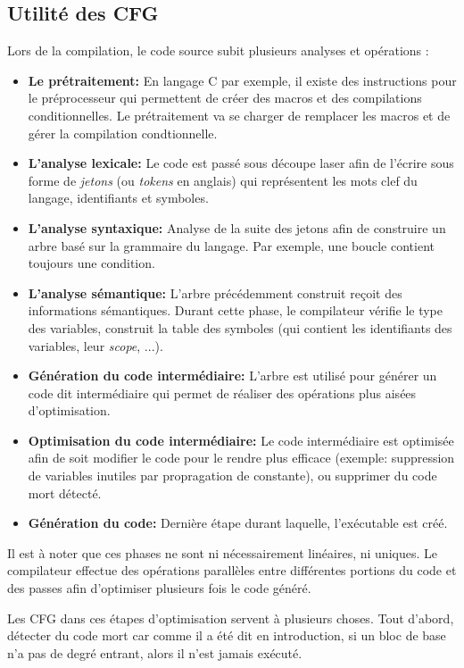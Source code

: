 \subsection{Utilité des CFG}
Lors de la compilation, le code source subit plusieurs analyses et opérations \cite{compilateurs}:
\begin{itemize}
    \item \textbf{Le prétraitement:} En langage C par exemple, il existe des instructions pour le préprocesseur qui permettent de créer des macros et des compilations conditionnelles. Le prétraitement va se charger de remplacer les macros et de gérer la compilation condtionnelle.
    \item \textbf{L'analyse lexicale:} Le code est passé sous découpe laser afin de l'écrire sous forme de \textit{jetons} (ou \textit{tokens} en anglais) qui représentent les mots clef du langage, identifiants et symboles. 
    \item \textbf{L'analyse syntaxique:} Analyse de la suite des jetons afin de construire un arbre basé sur la grammaire du langage. Par exemple, une boucle contient toujours une condition.
    \item \textbf{L'analyse sémantique:} L'arbre précédemment construit reçoit des informations sémantiques. Durant cette phase, le compilateur vérifie le type des variables, construit la table des symboles (qui contient les identifiants des variables, leur \textit{scope}, ...).
    \item \textbf{Génération du code intermédiaire:} L'arbre est utilisé pour générer un code dit intermédiaire qui permet de réaliser des opérations plus aisées d'optimisation.
    \item \textbf{Optimisation du code intermédiaire:} Le code intermédiaire est optimisée afin de soit modifier le code pour le rendre plus efficace (exemple: suppression de variables inutiles par propragation de constante), ou supprimer du code mort détecté.
    \item \textbf{Génération du code:} Dernière étape durant laquelle, l'exécutable est créé.
\end{itemize}
Il est à noter que ces phases ne sont ni nécessairement linéaires, ni uniques. Le compilateur effectue des opérations parallèles entre différentes portions du code et des passes afin d'optimiser plusieurs fois le code généré.

Les CFG dans ces étapes d'optimisation servent à plusieurs choses. Tout d'abord, détecter du code mort car comme il a été dit en introduction, si un bloc de base n'a pas de degré entrant, alors il n'est jamais exécuté.

